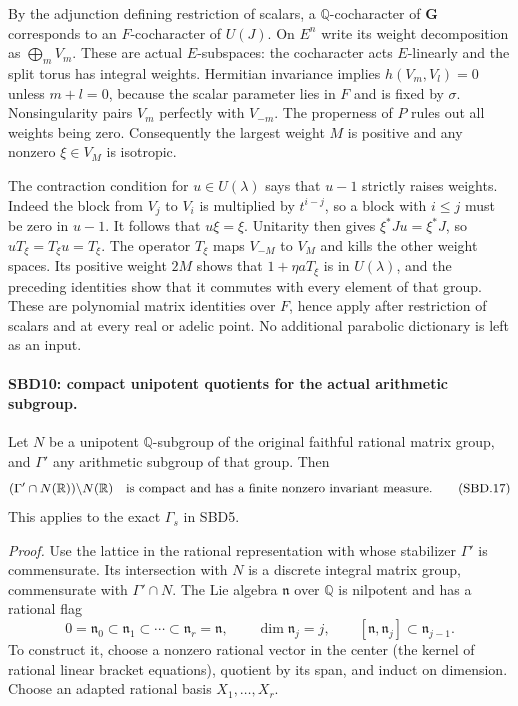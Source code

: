 By the adjunction defining restriction of scalars, a
\(\mathbb Q\)-cocharacter of \(\mathbf G\) corresponds to an
\(F\)-cocharacter of \(U(J)\).  On \(E^n\) write its weight
decomposition as \(\bigoplus_m V_m\).  These are actual
\(E\)-subspaces: the cocharacter acts \(E\)-linearly and the
split torus has integral weights.  Hermitian invariance implies
\(h(V_m,V_l)=0\) unless \(m+l=0\), because the scalar
parameter lies in \(F\) and is fixed by \(\sigma\).
Nonsingularity pairs \(V_m\) perfectly with \(V_{-m}\).
The properness of \(P\) rules out all weights being zero.
Consequently the largest weight \(M\) is positive and any
nonzero \(\xi\in V_M\) is isotropic.

The contraction condition for \(u\in U(\lambda)\) says that
\(u-1\) strictly raises weights.  Indeed the block from
\(V_j\) to \(V_i\) is multiplied by \(t^{i-j}\), so a block
with \(i\le j\) must be zero in \(u-1\).  It follows that
\(u\xi=\xi\).  Unitarity then gives
\(\xi^*Ju=\xi^*J\), so \(uT_\xi=T_\xi u=T_\xi\).
The operator \(T_\xi\) maps \(V_{-M}\) to \(V_M\) and
kills the other weight spaces.  Its positive weight \(2M\)
shows that \(1+\eta aT_\xi\) is in \(U(\lambda)\), and
the preceding identities show that it commutes with every
element of that group.  These are polynomial matrix identities
over \(F\), hence apply after restriction of scalars and at
every real or adelic point.  No additional parabolic dictionary
is left as an input.

\paragraph{SBD10: compact unipotent quotients for the actual arithmetic subgroup.}
\label{claim:SBD10}
Let \(N\) be a unipotent \(\mathbb Q\)-subgroup of the original
faithful rational matrix group, and \(\Gamma'\) any arithmetic
subgroup of that group.  Then
\[
 (\Gamma'\cap N(\mathbb R))\backslash N(\mathbb R)
 \quad\hbox{is compact and has a finite nonzero invariant measure.}
 \tag{SBD.17}
\]
This applies to the exact \(\Gamma_s\) in SBD5.

\emph{Proof.}
Use the lattice in the rational representation with whose
stabilizer \(\Gamma'\) is commensurate.  Its intersection with
\(N\) is a discrete integral matrix group, commensurate with
\(\Gamma'\cap N\).  The Lie algebra \(\mathfrak n\) over
\(\mathbb Q\) is nilpotent and has a rational flag
\[
 0=\mathfrak n_0\subset\mathfrak n_1\subset\cdots
  \subset\mathfrak n_r=\mathfrak n,\qquad
 \dim\mathfrak n_j=j,\qquad
 [\mathfrak n,\mathfrak n_j]\subset\mathfrak n_{j-1}.
 \tag{SBD.18}
\]
To construct it, choose a nonzero rational vector in the center
(the kernel of rational linear bracket equations), quotient by
its span, and induct on dimension.  Choose an adapted rational
basis \(X_1,\ldots,X_r\).

